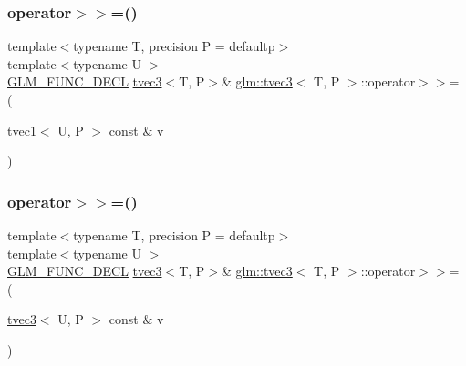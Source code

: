 \mbox{\label{structglm_1_1tvec3_a7cb73c7e9a6756532e450515bc7f67ec}} 
\subsubsection{\texorpdfstring{operator$>$$>$=()}{operator>>=()}\hspace{0.1cm}{\footnotesize\ttfamily [2/6]}}
{\footnotesize\ttfamily template$<$typename T, precision P = defaultp$>$ \\
template$<$typename U $>$ \\
\mbox{\hyperlink{setup_8hpp_ab2d052de21a70539923e9bcbf6e83a51}{G\+L\+M\+\_\+\+F\+U\+N\+C\+\_\+\+D\+E\+CL}} \mbox{\hyperlink{structglm_1_1tvec3}{tvec3}}$<$T, P$>$\& \mbox{\hyperlink{structglm_1_1tvec3}{glm\+::tvec3}}$<$ T, P $>$\+::operator$>$$>$= (\begin{DoxyParamCaption}\item[{\mbox{\hyperlink{structglm_1_1tvec1}{tvec1}}$<$ U, P $>$ const \&}]{v }\end{DoxyParamCaption})}

\mbox{\label{structglm_1_1tvec3_a42bc834efe85364cd4ec1f3398c433be}} 
\subsubsection{\texorpdfstring{operator$>$$>$=()}{operator>>=()}\hspace{0.1cm}{\footnotesize\ttfamily [3/6]}}
{\footnotesize\ttfamily template$<$typename T, precision P = defaultp$>$ \\
template$<$typename U $>$ \\
\mbox{\hyperlink{setup_8hpp_ab2d052de21a70539923e9bcbf6e83a51}{G\+L\+M\+\_\+\+F\+U\+N\+C\+\_\+\+D\+E\+CL}} \mbox{\hyperlink{structglm_1_1tvec3}{tvec3}}$<$T, P$>$\& \mbox{\hyperlink{structglm_1_1tvec3}{glm\+::tvec3}}$<$ T, P $>$\+::operator$>$$>$= (\begin{DoxyParamCaption}\item[{\mbox{\hyperlink{structglm_1_1tvec3}{tvec3}}$<$ U, P $>$ const \&}]{v }\end{DoxyParamCaption})}


